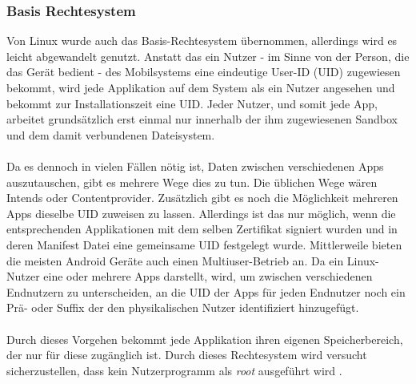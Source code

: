 	\subsubsection{Basis Rechtesystem}\label{sec:BasisRechteSystem}
	Von Linux wurde auch das Basis-Rechtesystem übernommen, allerdings wird es leicht abgewandelt genutzt. Anstatt das ein Nutzer - im Sinne von der Person, die das Gerät bedient - des Mobilsystems eine eindeutige User-ID (UID) zugewiesen bekommt, wird jede Applikation auf dem System als ein Nutzer angesehen und bekommt zur Installationszeit eine UID. Jeder Nutzer, und somit jede App, arbeitet grundsätzlich erst einmal nur innerhalb der ihm zugewiesenen Sandbox und dem damit verbundenen Dateisystem.\\\\
	Da es dennoch in vielen Fällen nötig ist, Daten zwischen verschiedenen Apps auszutauschen, gibt es mehrere Wege dies zu tun. Die üblichen Wege wären Intends oder Contentprovider. Zusätzlich gibt es noch die Möglichkeit mehreren Apps dieselbe UID zuweisen zu lassen. Allerdings ist das nur möglich, wenn die entsprechenden Applikationen mit dem selben Zertifikat signiert wurden und in deren Manifest Datei eine gemeinsame UID festgelegt wurde.
	Mittlerweile bieten die meisten Android Geräte auch einen Multiuser-Betrieb an. Da ein Linux-Nutzer eine oder mehrere Apps darstellt, wird, um zwischen verschiedenen Endnutzern zu unterscheiden, an die UID der Apps für jeden Endnutzer noch ein Prä- oder Suffix der den physikalischen Nutzer identifiziert hinzugefügt.\\\\
	Durch dieses Vorgehen bekommt jede Applikation ihren eigenen Speicherbereich, der nur für diese zugänglich ist. Durch dieses Rechtesystem wird versucht sicherzustellen, dass kein Nutzerprogramm als \textit{root} ausgeführt wird \cite[Kapitel Android's Security Model  - Application Sandboxing]{Drake2014}.
	
